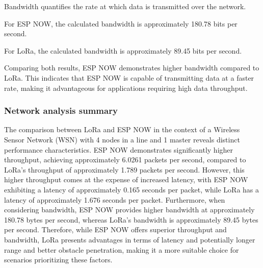Bandwidth quantifies the rate at which data is transmitted over the network.

For ESP NOW, the calculated bandwidth is approximately 180.78 bits per second.

For LoRa, the calculated bandwidth is approximately 89.45 bits per second.

Comparing both results, ESP NOW demonstrates higher bandwidth compared to LoRa. This indicates that ESP NOW is capable of transmitting data at a faster rate, making it advantageous for applications requiring high data throughput.

\subsubsection{Network analysis summary}

The comparison between LoRa and ESP NOW in the context of a Wireless Sensor Network (WSN) with 4 nodes in a line and 1 master reveals distinct performance characteristics. ESP NOW demonstrates significantly higher throughput, achieving approximately 6.0261 packets per second, compared to LoRa's throughput of approximately 1.789 packets per second. However, this higher throughput comes at the expense of increased latency, with ESP NOW exhibiting a latency of approximately 0.165 seconds per packet, while LoRa has a latency of approximately 1.676 seconds per packet. Furthermore, when considering bandwidth, ESP NOW provides higher bandwidth at approximately 180.78 bytes per second, whereas LoRa's bandwidth is approximately 89.45 bytes per second. Therefore, while ESP NOW offers superior throughput and bandwidth, LoRa presents advantages in terms of latency and potentially longer range and better obstacle penetration, making it a more suitable choice for scenarios prioritizing these factors.






